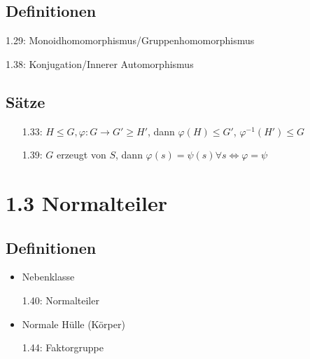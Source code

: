 \documentclass[twocolumn]{report}
\begin{document}
\subsection*{Definitionen}
\begin{enumerate*}[itemsep=0pt, topsep=0pt, parsep=0pt, partopsep=0pt, leftmargin=*]
    \item[1.29:] Monoidhomomorphismus/Gruppenhomomorphismus
    \item[1.38:] Konjugation/Innerer Automorphismus
\end{enumerate*}

\subsection*{Sätze}
\begin{enumerate}[itemsep=0pt, topsep=0pt, parsep=0pt, partopsep=0pt, leftmargin=*]
    \item[1.33:] $H \leq G, \varphi: G \to G' \geq H'$, dann $\varphi(H) \leq G'$, $\varphi^{-1}(H') \leq G$
    \item[1.39:] $G$ erzeugt von $S$, dann $\varphi(s) = \psi(s) \forall s \Leftrightarrow \varphi =\psi$
\end{enumerate}

\section*{1.3 Normalteiler}
\subsection*{Definitionen}
\begin{itemize}[itemsep=0pt, topsep=0pt, parsep=0pt, partopsep=0pt, leftmargin=*]
    \item Nebenklasse
    \item[1.40:] Normalteiler
    \item Normale Hülle (Körper)
    \item[1.44:] Faktorgruppe
\end{itemize}
\end{document}
